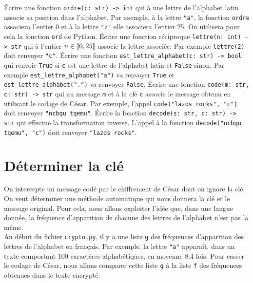 \documentclass{magnolia}
\begin{document}
\begin{questions}
\question Écrire une fonction \verb_ordre(c: str) -> int_ qui à une lettre de l'alphabet
  latin associe sa position dans l'alphabet. Par exemple, à la lettre \verb_"a"_,
	la fonction \verb_ordre_ associera l'entier 0 et à la lettre \verb_"z"_ elle associera
	l'entier 25. On utilisera pour cela la fonction \verb_ord_ de Python.
\question Écrire une fonction réciproque \verb_lettre(n: int) -> str_  qui à l'entier
  $n\in\left\llbracket 0,25\right\rrbracket$ associe la lettre associée. Par exemple \verb_lettre(2)_ doit renvoyer
	\verb_"c"_.
\question Écrire une fonction \verb!est_lettre_alphabet(c: str) -> bool! qui renvoie
  \verb_True_ si \verb_c_ est une lettre de l'alphabet latin et \verb_False_ sinon.
	Par exemple \verb!est_lettre_alphabet("a")! va renvoyer \verb_True_ et
	\verb!est_lettre_alphabet(".")! va renvoyer \verb_False_.
\question Écrire une fonction \verb_code(m: str, c: str) -> str_ qui au message \verb_m_
  et à la clé \verb_c_ associe le message obtenu en utilisant le codage de
	César. Par exemple, l'appel \verb_code("lazos rocks", "c")_ doit renvoyer
	\verb_"ncbqu tqemu"_.
\question Écrire la fonction \verb_decode(s: str, c: str) -> str_ qui effectue
  la transformation inverse. L'appel à la fonction
	\verb_decode("ncbqu tqemu", "c")_ doit renvoyer \verb_"lazos rocks"_.
\end{questions}

\section{Déterminer la clé}

On intercepte un message codé par le chiffrement de César dont on ignore la clé.
On veut déterminer une méthode automatique qui nous donnera la clé et le message original.
Pour cela, nous allons exploiter l'idée que, dans une langue donnée, la fréquence
d'apparition de chacune des lettres de l'alphabet n'est pas la même.\\

Au début du fichier \texttt{crypto.py}, il y a une liste \verb_g_ des fréquences
d'apparition des lettres de l'alphabet en français. Par exemple, la lettre \verb_"a"_
apparaît, dans un texte comportant  $100$ caractères alphabétiques, en moyenne $8.4$
fois. Pour casser le codage de César, nous allons comparer cette liste \verb_g_
à la liste \verb_f_ des fréquences obtenues dans le texte encrypté.
\end{document}
